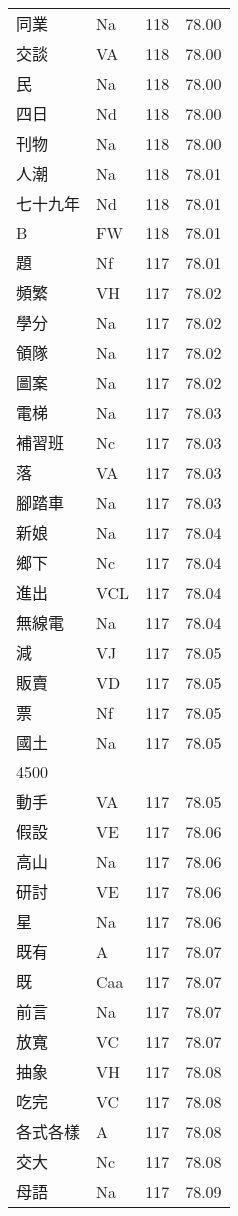 \documentclass[twocolumn]{book}
\begin{document}
\begin{supertabular}{llrr}
同業 & Na & 118 &  78.00\\
交談 & VA & 118 &  78.00\\
民 & Na & 118 &  78.00\\
四日 & Nd & 118 &  78.00\\
刊物 & Na & 118 &  78.00\\
人潮 & Na & 118 &  78.01\\
七十九年 & Nd & 118 &  78.01\\
B & FW & 118 &  78.01\\
題 & Nf & 117 &  78.01\\
頻繁 & VH & 117 &  78.02\\
學分 & Na & 117 &  78.02\\
領隊 & Na & 117 &  78.02\\
圖案 & Na & 117 &  78.02\\
電梯 & Na & 117 &  78.03\\
補習班 & Nc & 117 &  78.03\\
落 & VA & 117 &  78.03\\
腳踏車 & Na & 117 &  78.03\\
新娘 & Na & 117 &  78.04\\
鄉下 & Nc & 117 &  78.04\\
進出 & VCL & 117 &  78.04\\
無線電 & Na & 117 &  78.04\\
減 & VJ & 117 &  78.05\\
販賣 & VD & 117 &  78.05\\
票 & Nf & 117 &  78.05\\
國土 & Na & 117 &  78.05\\
4500\\
動手 & VA & 117 &  78.05\\
假設 & VE & 117 &  78.06\\
高山 & Na & 117 &  78.06\\
研討 & VE & 117 &  78.06\\
星 & Na & 117 &  78.06\\
既有 & A & 117 &  78.07\\
既 & Caa & 117 &  78.07\\
前言 & Na & 117 &  78.07\\
放寬 & VC & 117 &  78.07\\
抽象 & VH & 117 &  78.08\\
吃完 & VC & 117 &  78.08\\
各式各樣 & A & 117 &  78.08\\
交大 & Nc & 117 &  78.08\\
母語 & Na & 117 &  78.09\\

\end{supertabular}
\end{document}
